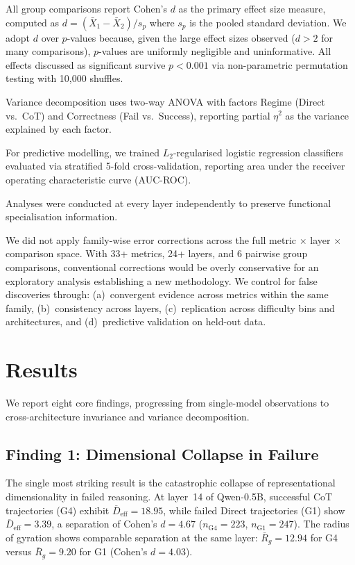 \documentclass[11pt,twocolumn]{article}
\newcommand{\groupone}{\textsc{G1}}
\newcommand{\groupfour}{\textsc{G4}}
\begin{document}
All group comparisons report Cohen's $d$ as the primary effect size measure, computed as $d = (\bar{X}_1 - \bar{X}_2) / s_p$ where $s_p$ is the pooled standard deviation. We adopt $d$ over $p$-values because, given the large effect sizes observed ($d > 2$ for many comparisons), $p$-values are uniformly negligible and uninformative. All effects discussed as significant survive $p < 0.001$ via non-parametric permutation testing with 10,000 shuffles.

Variance decomposition uses two-way ANOVA with factors Regime (Direct vs.\ CoT) and Correctness (Fail vs.\ Success), reporting partial $\eta^2$ as the variance explained by each factor.

For predictive modelling, we trained $L_2$-regularised logistic regression classifiers evaluated via stratified 5-fold cross-validation, reporting area under the receiver operating characteristic curve (AUC-ROC).

Analyses were conducted at every layer independently to preserve functional specialisation information.

We did not apply family-wise error corrections across the full metric $\times$ layer $\times$ comparison space. With 33+ metrics, 24+ layers, and 6 pairwise group comparisons, conventional corrections would be overly conservative for an exploratory analysis establishing a new methodology. We control for false discoveries through: (a)~convergent evidence across metrics within the same family, (b)~consistency across layers, (c)~replication across difficulty bins and architectures, and (d)~predictive validation on held-out data.


\section{Results}
\label{sec:results}

We report eight core findings, progressing from single-model observations to cross-architecture invariance and variance decomposition.

\subsection{Finding 1: Dimensional Collapse in Failure}
\label{sec:finding1}

The single most striking result is the catastrophic collapse of representational dimensionality in failed reasoning. At layer~14 of Qwen-0.5B, successful CoT trajectories (\groupfour) exhibit $\overline{D}_{\text{eff}} = 18.95$, while failed Direct trajectories (\groupone) show $\overline{D}_{\text{eff}} = 3.39$, a separation of Cohen's $d = 4.67$ ($n_{\text{G4}} = 223$, $n_{\text{G1}} = 247$). The radius of gyration shows comparable separation at the same layer: $\overline{R}_g = 12.94$ for \groupfour{} versus $\overline{R}_g = 9.20$ for \groupone{} (Cohen's $d = 4.03$).
\end{document}
